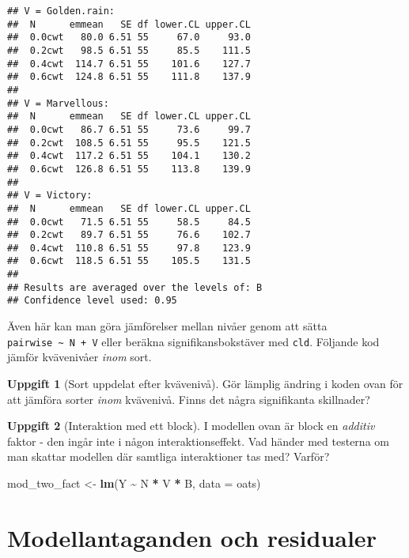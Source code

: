 \documentclass[
]{book}
\newenvironment{Shaded}{\begin{snugshade}}{\end{snugshade}}
\newcommand{\AttributeTok}[1]{\textcolor[rgb]{0.13,0.29,0.53}{#1}}
\newcommand{\FunctionTok}[1]{\textcolor[rgb]{0.13,0.29,0.53}{\textbf{#1}}}
\newcommand{\NormalTok}[1]{#1}
\newcommand{\OtherTok}[1]{\textcolor[rgb]{0.56,0.35,0.01}{#1}}
\newcommand{\SpecialCharTok}[1]{\textcolor[rgb]{0.81,0.36,0.00}{\textbf{#1}}}
\theoremstyle{definition}
\theoremstyle{definition}
\theoremstyle{definition}
\newtheorem{exercise}{Uppgift}[chapter]
\theoremstyle{definition}
\theoremstyle{remark}
\begin{document}
\begin{verbatim}
## V = Golden.rain:
##  N      emmean   SE df lower.CL upper.CL
##  0.0cwt   80.0 6.51 55     67.0     93.0
##  0.2cwt   98.5 6.51 55     85.5    111.5
##  0.4cwt  114.7 6.51 55    101.6    127.7
##  0.6cwt  124.8 6.51 55    111.8    137.9
## 
## V = Marvellous:
##  N      emmean   SE df lower.CL upper.CL
##  0.0cwt   86.7 6.51 55     73.6     99.7
##  0.2cwt  108.5 6.51 55     95.5    121.5
##  0.4cwt  117.2 6.51 55    104.1    130.2
##  0.6cwt  126.8 6.51 55    113.8    139.9
## 
## V = Victory:
##  N      emmean   SE df lower.CL upper.CL
##  0.0cwt   71.5 6.51 55     58.5     84.5
##  0.2cwt   89.7 6.51 55     76.6    102.7
##  0.4cwt  110.8 6.51 55     97.8    123.9
##  0.6cwt  118.5 6.51 55    105.5    131.5
## 
## Results are averaged over the levels of: B 
## Confidence level used: 0.95
\end{verbatim}

Även här kan man göra jämförelser mellan nivåer genom att sätta \texttt{pairwise\ \textasciitilde{}\ N\ +\ V} eller beräkna signifikansbokstäver med \texttt{cld}. Följande kod jämför kvävenivåer \emph{inom} sort.

\begin{exercise}[Sort uppdelat efter kvävenivå]
Gör lämplig ändring i koden ovan för att jämföra sorter \emph{inom} kvävenivå. Finns det några signifikanta skillnader?
\end{exercise}

\begin{exercise}[Interaktion med ett block]

I modellen ovan är block en \emph{additiv} faktor - den ingår inte i någon interaktionseffekt. Vad händer med testerna om man skattar modellen där samtliga interaktioner tas med? Varför?

\begin{Shaded}
\begin{Highlighting}[]
\NormalTok{mod\_two\_fact }\OtherTok{\textless{}{-}} \FunctionTok{lm}\NormalTok{(Y }\SpecialCharTok{\textasciitilde{}}\NormalTok{ N }\SpecialCharTok{*}\NormalTok{ V }\SpecialCharTok{*}\NormalTok{ B, }\AttributeTok{data =}\NormalTok{ oats)}
\end{Highlighting}
\end{Shaded}

\end{exercise}

\hypertarget{modellantaganden-och-residualer}{%
\section{Modellantaganden och residualer}\label{modellantaganden-och-residualer}}
\end{document}
